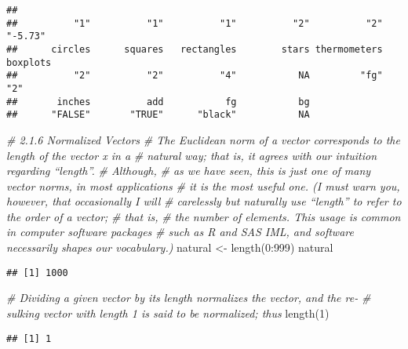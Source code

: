 \documentclass[
]{article}
\newenvironment{Shaded}{\begin{snugshade}}{\end{snugshade}}
\newcommand{\CommentTok}[1]{\textcolor[rgb]{0.56,0.35,0.01}{\textit{#1}}}
\newcommand{\DecValTok}[1]{\textcolor[rgb]{0.00,0.00,0.81}{#1}}
\newcommand{\FunctionTok}[1]{\textcolor[rgb]{0.00,0.00,0.00}{#1}}
\newcommand{\NormalTok}[1]{#1}
\newcommand{\OtherTok}[1]{\textcolor[rgb]{0.56,0.35,0.01}{#1}}
\newcommand{\SpecialCharTok}[1]{\textcolor[rgb]{0.00,0.00,0.00}{#1}}
\begin{document}
\begin{verbatim}
##                                                                               
##          "1"          "1"          "1"          "2"          "2"      "-5.73" 
##      circles      squares   rectangles        stars thermometers     boxplots 
##          "2"          "2"          "4"           NA         "fg"          "2" 
##       inches          add           fg           bg 
##      "FALSE"       "TRUE"      "black"           NA
\end{verbatim}

\begin{Shaded}
\begin{Highlighting}[]
\CommentTok{\# 2.1.6 Normalized Vectors}
\CommentTok{\# The Euclidean norm of a vector corresponds to the length of the vector x in a}
\CommentTok{\# natural way; that is, it agrees with our intuition regarding “length”. }
\CommentTok{\# Although,}
\CommentTok{\# as we have seen, this is just one of many vector norms, in most applications}
\CommentTok{\# it is the most useful one. (I must warn you, however, that occasionally I will}
\CommentTok{\# carelessly but naturally use “length” to refer to the order of a vector; }
\CommentTok{\# that is,}
\CommentTok{\# the number of elements. This usage is common in computer software packages}
\CommentTok{\# such as R and SAS IML, and software necessarily shapes our vocabulary.)}
\NormalTok{natural }\OtherTok{\textless{}{-}} \FunctionTok{length}\NormalTok{(}\DecValTok{0}\SpecialCharTok{:}\DecValTok{999}\NormalTok{)}
\NormalTok{natural}
\end{Highlighting}
\end{Shaded}

\begin{verbatim}
## [1] 1000
\end{verbatim}

\begin{Shaded}
\begin{Highlighting}[]
\CommentTok{\# Dividing a given vector by its length normalizes the vector, and the re{-}}
\CommentTok{\# sulking vector with length 1 is said to be normalized; thus}
\FunctionTok{length}\NormalTok{(}\DecValTok{1}\NormalTok{)}
\end{Highlighting}
\end{Shaded}

\begin{verbatim}
## [1] 1
\end{verbatim}
\end{document}
